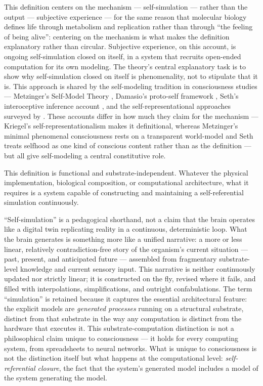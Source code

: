 \documentclass[12pt]{article}
\begin{document}
This definition centers on the mechanism --- self-simulation --- rather than the output --- subjective experience --- for the same reason that molecular biology defines life through metabolism and replication rather than through ``the feeling of being alive'': centering on the mechanism is what makes the definition explanatory rather than circular. Subjective experience, on this account, is ongoing self-simulation closed on itself, in a system that recruits open-ended computation for its own modeling. The theory's central explanatory task is to show why self-simulation closed on itself is phenomenality, not to stipulate that it is. This approach is shared by the self-modeling tradition in consciousness studies --- Metzinger's Self-Model Theory \citep{Metzinger2003}, Damasio's proto-self framework \citep{Damasio1999,Damasio2010}, Seth's interoceptive inference account \citep{Seth2021}, and the self-representational approaches surveyed by \citet{Kriegel2006}. These accounts differ in how much they claim for the mechanism --- Kriegel's self-representationalism makes it definitional, whereas Metzinger's minimal phenomenal consciousness rests on a transparent world-model and Seth treats selfhood as one kind of conscious content rather than as the definition --- but all give self-modeling a central constitutive role.

This definition is functional and substrate-independent. Whatever the physical implementation, biological composition, or computational architecture, what it requires is a system capable of constructing and maintaining a self-referential simulation continuously.

``Self-simulation'' is a pedagogical shorthand, not a claim that the brain operates like a digital twin replicating reality in a continuous, deterministic loop. What the brain generates is something more like a unified narrative: a more or less linear, relatively contradiction-free story of the organism's current situation --- past, present, and anticipated future --- assembled from fragmentary substrate-level knowledge and current sensory input. This narrative is neither continuously updated nor strictly linear; it is constructed on the fly, revised where it fails, and filled with interpolations, simplifications, and outright confabulations. The term ``simulation'' is retained because it captures the essential architectural feature: the explicit models are \emph{generated processes} running on a structural substrate, distinct from that substrate in the way any computation is distinct from the hardware that executes it. This substrate-computation distinction is not a philosophical claim unique to consciousness --- it holds for every computing system, from spreadsheets to neural networks. What is unique to consciousness is not the distinction itself but what happens at the computational level: \emph{self-referential closure}, the fact that the system's generated model includes a model of the system generating the model.
\end{document}
